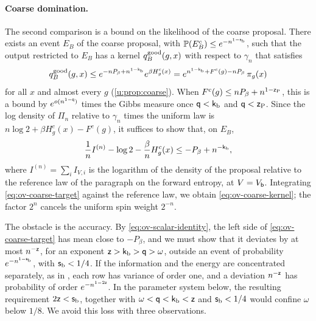 \paragraph{Coarse domination.} The second comparison is a bound on the
likelihood of the coarse proposal. There exists an event $E_B$ of the
coarse proposal, with $\mathbb P(E_B^c)\le e^{-n^{1-\mathsf{s}_{\rm b}}}$, such that the
output restricted to $E_B$ has a kernel $q_B^{\rm good}(g,x)$ with respect to
$\gamma_n$ that satisfies
\begin{equation}\label{eq:ov-coarse-kernel}
 q_B^{\rm good}(g,x)\le e^{-nP_\beta+n^{1-\mathsf{k}_{\rm b}}}e^{\beta H^c_g(x)}
 =e^{n^{1-\mathsf{k}_{\rm b}}+F^c(g)-nP_\beta}\,\pi_g(x)
\end{equation}
for all $x$ and almost every $g$ (\cref{u:prop:coarse}). When
$F^c(g)\le nP_\beta+n^{1-\mathsf{z}_{\rm P}}$, this is a bound by
$e^{o(n^{1-\mathsf{q}})}$ times the Gibbs measure once $\mathsf{q}<\mathsf{k}_{\rm b}$ and
$\mathsf{q}<\mathsf{z}_{\rm P}$. Since the log density of $\Pi_n$ relative to $\gamma_n$
times the uniform law is $n\log2+\beta H^c_g(x)-F^c(g)$, it suffices to show
that, on $E_B$,
\begin{equation}\label{eq:ov-coarse-target}
 \frac1nI^{(n)}-\log2-\frac\beta nH^c_g(x)\le-P_\beta+n^{-\mathsf{k}_{\rm b}},
\end{equation}
where $I^{(n)}=\sum_iI_{V,i}$ is the logarithm of the density of the proposal
relative to the reference law of the paragraph on the forward entropy, at
$V=V_{\mathsf{b}}$. Integrating \eqref{eq:ov-coarse-target} against the reference
law, we obtain \eqref{eq:ov-coarse-kernel}; the factor $2^n$ cancels the
uniform spin weight $2^{-n}$.

The obstacle is the accuracy. By \eqref{eq:ov-scalar-identity}, the left
side of \eqref{eq:ov-coarse-target} has mean close to $-P_\beta$, and we must
show that it deviates by at most $n^{-\mathsf{z}}$, for an exponent
$\mathsf{z}>\mathsf{k}_{\rm b}>\mathsf{q}>\omega$, outside an event of probability
$e^{-n^{1-\mathsf{s}_{\rm b}}}$, with $\mathsf{s}_{\rm b}<1/4$. If the information and
the energy are concentrated separately, as in
\cite[Proposition~5]{oai-typical-upper}, each row has variance of order one,
and a deviation $n^{-\mathsf{z}}$ has probability of order
$e^{-n^{1-2\mathsf{z}}}$. In the parameter system below, the resulting requirement
$2\mathsf{z}<\mathsf{s}_{\rm b}$, together with $\omega<\mathsf{q}<\mathsf{k}_{\rm b}<\mathsf{z}$ and $\mathsf{s}_{\rm b}<1/4$ would
confine $\omega$ below $1/8$. We avoid this loss with three observations.

